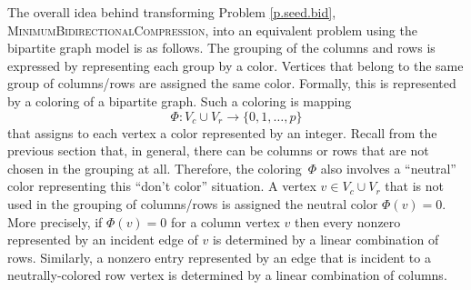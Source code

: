 \documentclass[12pt, oneside]{book}
\newcommand{\MinBidCom}{\textsc{MinimumBidirectionalCompression}}
\begin{document}
The overall idea behind transforming Problem \ref{p.seed.bid}, \MinBidCom, into an equivalent
problem using the bipartite graph model is as follows. The grouping of the columns and
rows is expressed by representing each group by a color. Vertices that belong to the same
group of columns/rows are assigned the same color. Formally, this is represented by a
coloring of a bipartite graph. Such a coloring is mapping
$$
\Phi:V_c \cup V_r \to \{0,1,\dots ,p\}
$$
that assigns to each vertex a color represented by an integer. Recall from the previous
section that, in general, there can be columns or rows that are not chosen in the
grouping at all. Therefore, the coloring~$\Phi$ also involves a ``neutral'' color
representing this ``don't color'' situation. A vertex $v \in V_c \cup V_r$ that is not
used in the grouping of columns/rows is assigned the neutral color $\Phi(v)=0$. More
precisely, if $\Phi(v)=0$ for a column vertex $v$ then every nonzero represented by an
incident edge of $v$ is determined by a linear combination of rows. Similarly, a nonzero
entry represented by an edge that is incident to a neutrally-colored row vertex is
determined by a linear combination of columns.
\end{document}
